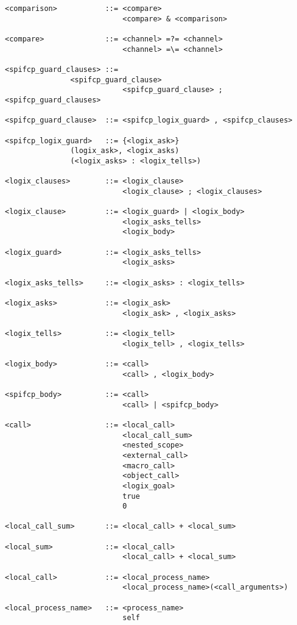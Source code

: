\documentclass[twoside,10pt]{report}
\begin{document}
\begin{verbatim}
<comparison>           ::= <compare>
                           <compare> & <comparison>

<compare>              ::= <channel> =?= <channel>
                           <channel> =\= <channel>

<spifcp_guard_clauses> ::=
			   <spifcp_guard_clause> 
                           <spifcp_guard_clause> ; <spifcp_guard_clauses>

<spifcp_guard_clause>  ::= <spifcp_logix_guard> , <spifcp_clauses>

<spifcp_logix_guard>   ::= {<logix_ask>}
			   (logix_ask>, <logix_asks)
			   (<logix_asks> : <logix_tells>)

<logix_clauses>        ::= <logix_clause>
                           <logix_clause> ; <logix_clauses>

<logix_clause>         ::= <logix_guard> | <logix_body>
                           <logix_asks_tells>
                           <logix_body>

<logix_guard>          ::= <logix_asks_tells>
                           <logix_asks>

<logix_asks_tells>     ::= <logix_asks> : <logix_tells>

<logix_asks>           ::= <logix_ask>
                           <logix_ask> , <logix_asks>

<logix_tells>          ::= <logix_tell>
                           <logix_tell> , <logix_tells>

<logix_body>           ::= <call>
                           <call> , <logix_body>

<spifcp_body>          ::= <call>
                           <call> | <spifcp_body>

<call>                 ::= <local_call>
                           <local_call_sum>
                           <nested_scope>
                           <external_call>
                           <macro_call>
                           <object_call>
                           <logix_goal>
                           true
                           0

<local_call_sum>       ::= <local_call> + <local_sum>

<local_sum>            ::= <local_call>
                           <local_call> + <local_sum>

<local_call>           ::= <local_process_name>
                           <local_process_name>(<call_arguments>)

<local_process_name>   ::= <process_name>
                           self


\end{verbatim}
\end{document}
